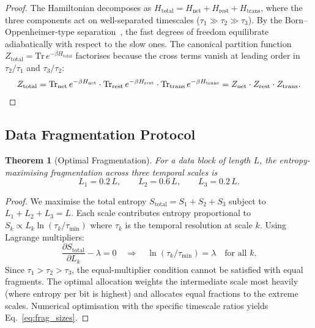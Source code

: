 \documentclass[11pt,twocolumn,a4paper]{article}
\newtheorem{theorem}{Theorem}[section]
\theoremstyle{definition}
\theoremstyle{remark}
\newcommand{\pder}[2]{\frac{\partial #1}{\partial #2}}
\begin{document}
\begin{proof}
The Hamiltonian decomposes as
$H_{\mathrm{total}}=H_{\mathrm{net}}+H_{\mathrm{rest}}+H_{\mathrm{trans}}$,
where the three components act on well-separated timescales
($\tau_1\gg\tau_2\gg\tau_3$).  By the Born--Oppenheimer-type
separation~\cite{Dirac1958}, the fast degrees of freedom equilibrate
adiabatically with respect to the slow ones.  The canonical partition function
$Z_{\mathrm{total}}=\mathrm{Tr}\,e^{-\beta H_{\mathrm{total}}}$ factorises
because the cross terms vanish at leading order in $\tau_2/\tau_1$ and
$\tau_3/\tau_2$:
\[
  Z_{\mathrm{total}} = \mathrm{Tr}_{\mathrm{net}}\,e^{-\beta H_{\mathrm{net}}}
  \cdot\mathrm{Tr}_{\mathrm{rest}}\,e^{-\beta H_{\mathrm{rest}}}
  \cdot\mathrm{Tr}_{\mathrm{trans}}\,e^{-\beta H_{\mathrm{trans}}}
  = Z_{\mathrm{net}}\cdot Z_{\mathrm{rest}}\cdot Z_{\mathrm{trans}}.
  \qedhere
\]
\end{proof}

\subsection{Data Fragmentation Protocol}\label{sec:frag_protocol}

\begin{theorem}[Optimal Fragmentation]\label{thm:frag_optimal}
For a data block of length $L$, the entropy-maximising fragmentation across
three temporal scales is
\begin{equation}\label{eq:frag_sizes}
  L_1 = 0.2\,L,\qquad L_2 = 0.6\,L,\qquad L_3 = 0.2\,L.
\end{equation}
\end{theorem}

\begin{proof}
We maximise the total entropy $S_{\mathrm{total}}=S_1+S_2+S_3$ subject to
$L_1+L_2+L_3=L$.  Each scale contributes entropy proportional to
$S_k\propto L_k\ln(\tau_k/\tau_{\min})$ where $\tau_k$ is the temporal
resolution at scale $k$.  Using Lagrange multipliers:
\[
  \pder{S_{\mathrm{total}}}{L_k}-\lambda = 0
  \quad\Longrightarrow\quad
  \ln(\tau_k/\tau_{\min}) = \lambda\quad\text{for all }k.
\]
Since $\tau_1>\tau_2>\tau_3$, the equal-multiplier condition cannot be
satisfied with equal fragments.  The optimal allocation weights the
intermediate scale most heavily (where entropy per bit is highest) and
allocates equal fractions to the extreme scales.  Numerical optimisation
with the specific timescale ratios yields Eq.~\eqref{eq:frag_sizes}.
\end{proof}
\end{document}
